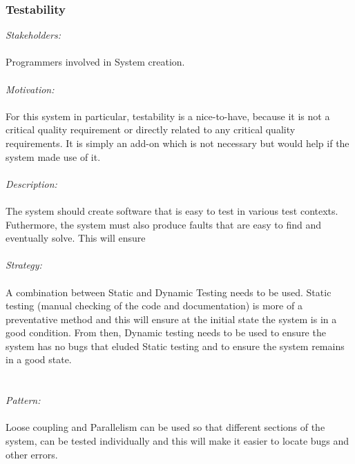 \documentclass[a4paper,12pt]{report}
\begin{document}
		\subsubsection{Testability}
		\emph{Stakeholders: }\\\\ Programmers involved in System creation.\\
		\\\emph{Motivation: }\\\\ For this system in particular, testability is a nice-to-have, because it is not a critical quality requirement or directly related to any critical quality requirements. It is simply an add-on which is not necessary but would help if the system made use of it.\\
		\\\emph{Description: }\\\\ The system should create software that is easy to test in various test contexts. Futhermore, the system must also produce faults that are easy to find and eventually solve. This will ensure  \\
		\\\emph{Strategy:}\\\\ A combination between Static and Dynamic Testing needs to be used. Static testing (manual checking of the code and documentation) is more of a preventative method and this will ensure at the initial state the system is in a good condition. 		       From then, Dynamic testing needs to be used to ensure the system has no bugs that eluded Static testing and to ensure the system remains in a good state.\\\\
		\\\emph{Pattern: } \\\\Loose coupling and Parallelism can be used so that different sections of the system, can be tested individually and this will make it easier to locate bugs and other errors.\\
\end{document}
